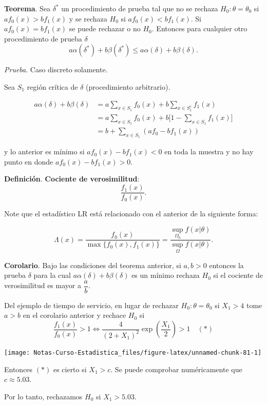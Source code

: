 \documentclass[
  12pt,
]{book}
\begin{document}
\textbf{Teorema}. Sea \(\delta^*\) un procedimiento de prueba tal que no se rechaza \(H_0:\theta=\theta_0\) si \(af_0(x) > bf_1(x)\) y se rechaza \(H_0\) si \(af_0(x) < bf_1(x)\). Si \(af_0(x) = bf_1(x)\) se puede rechazar o no \(H_0\). Entonces para cualquier otro procedimiento de prueba \(\delta\)
\[a\alpha(\delta^*) + b\beta(\delta^*) \leq a\alpha(\delta) + b\beta(\delta). \]

\emph{Prueba}. Caso discreto solamente.

Sea \(S_1\) región crítica de \(\delta\) (procedimiento arbitrario).

\begin{align*}
a\alpha(\delta) + b\beta(\delta) & = a\sum_{x\in S_1}f_0(x) + b\sum_{x\in S_1^c}f_1(x) \\
& = a\sum_{x\in S_1}f_0(x) + b\bigg[1-\sum_{x\in S_1}f_1(x)\bigg]\\
& = b + \sum_{x\in S_1}(af_0-bf_1(x)) 
\end{align*}

y lo anterior es mínimo si \(af_0(x)-bf_1(x)<0\) en toda la muestra y no hay punto en donde \(af_0(x)-bf_1(x)>0\).

\textbf{Definición}. \textbf{Cociente de verosimilitud}:
\[\dfrac{f_1(x)}{f_0(x)}.\]

Note que el estadístico LR está relacionado con el anterior de la siguiente forma:

\[\Lambda(x) = \dfrac{f_0(x)}{\max\{f_0(x),f_1(x)\}} = \dfrac{\sup_{\Omega_0}f(x|\theta)}{\sup_{\Omega}f(x|\theta)}.\]

\textbf{Corolario}. Bajo las condiciones del teorema anterior, si \(a,b>0\) entonces la prueba \(\delta\) para la cual \(a\alpha(\delta) + b\beta(\delta)\) es un mínimo rechaza \(H_0\) si el cociente de verosimilitud es mayor a \(\dfrac ab\).

Del ejemplo de tiempo de servicio, en lugar de rechazar \(H_0: \theta = \theta_0\) si \(X_1>4\) tome \(a>b\) en el corolario anterior y rechace \(H_0\) si
\[\dfrac{f_1(x)}{f_0(x)}>1\Leftrightarrow \dfrac 4{(2+X_1)^2}\exp\left(\dfrac{X_1}2\right)>1\quad(*)\]

\begin{center}\texttt{[image: Notas-Curso-Estadistica\_files/figure-latex/unnamed-chunk-81-1]} \end{center}

Entonces \((*)\) es cierto si \(X_1>c\). Se puede comprobar numéricamente que \(c\approx5.03\).

Por lo tanto, rechazamos \(H_0\) si \(X_1>5.03\).
\end{document}
